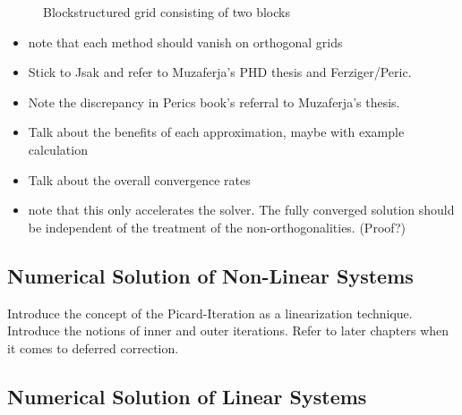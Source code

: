       \begin{figure}
      \label{fig:blockstruc}
      \qquad
      \caption{Blockstructured grid consisting of two blocks}
      \end{figure}

    \begin{itemize}
      \item note that each method should vanish on orthogonal grids
      \item Stick to Jsak and refer to Muzaferja's PHD thesis and Ferziger/Peric. 
      \item Note the discrepancy in Perics book's referral to Muzaferja's thesis. 
      \item Talk about the benefits of each approximation, maybe with example calculation 
      \item Talk about the overall convergence rates
      \item note that this only accelerates the solver. The fully converged solution should be independent of the treatment of the non-orthogonalities. (Proof?)
    \end{itemize}

    \subsection{Numerical Solution of Non-Linear Systems}

      Introduce the concept of the Picard-Iteration as a linearization technique. Introduce the notions of inner and outer iterations. Refer to later chapters when it comes to deferred correction.

    \subsection{Numerical Solution of Linear Systems}

